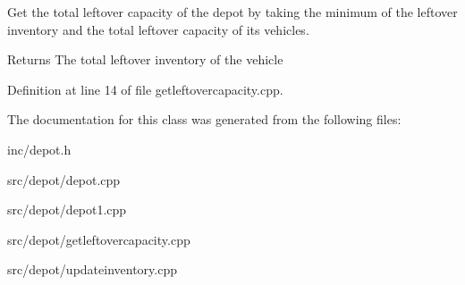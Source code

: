 Get the total leftover capacity of the depot by taking the minimum of the leftover inventory and the total leftover capacity of its vehicles. 

\begin{DoxyReturn}{Returns}
The total leftover inventory of the vehicle 
\end{DoxyReturn}


Definition at line 14 of file getleftovercapacity.\+cpp.



The documentation for this class was generated from the following files\+:\begin{DoxyCompactItemize}
\item 
inc/depot.\+h\item 
src/depot/depot.\+cpp\item 
src/depot/depot1.\+cpp\item 
src/depot/getleftovercapacity.\+cpp\item 
src/depot/updateinventory.\+cpp\end{DoxyCompactItemize}
